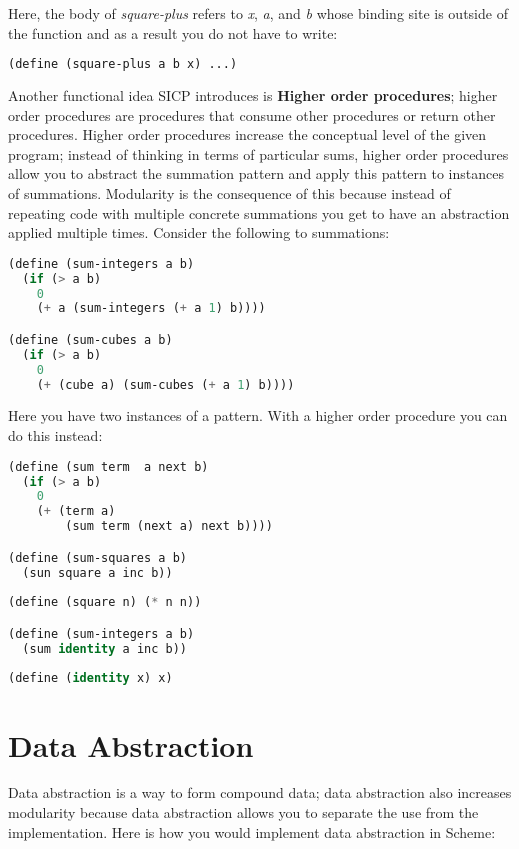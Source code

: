 \documentclass{amsbook}
\begin{document}
Here, the body of \textit{square-plus} refers to \textit{x}, \textit{a}, and \textit{b} whose binding site is outside of the function and as a result you do not have to write:

\begin{lstlisting}[language=Lisp]
(define (square-plus a b x) ...)
\end{lstlisting}
     
Another functional idea SICP introduces is \textbf{Higher order procedures}; higher order procedures are procedures that consume other procedures or return other procedures. Higher order procedures increase the conceptual level of the given program; instead of thinking in terms of particular sums, higher order procedures allow you to abstract the summation pattern and apply this pattern to instances of summations. Modularity is the consequence of this because instead of repeating code with multiple concrete summations you get to have an abstraction applied multiple times. Consider the following to summations:

\begin{lstlisting}[language=Lisp]
(define (sum-integers a b)
  (if (> a b)
  	0
  	(+ a (sum-integers (+ a 1) b))))

(define (sum-cubes a b)
  (if (> a b)
  	0
  	(+ (cube a) (sum-cubes (+ a 1) b))))
\end{lstlisting}

Here you have two instances of a pattern. With a higher order procedure you can do this instead:

\begin{lstlisting}[language=Lisp]
(define (sum term  a next b)
  (if (> a b)
  	0
  	(+ (term a)
     	(sum term (next a) next b))))

(define (sum-squares a b)
  (sun square a inc b))
  
(define (square n) (* n n))

(define (sum-integers a b)
  (sum identity a inc b))
  
(define (identity x) x)
\end{lstlisting}

\section{Data Abstraction}

Data abstraction is a way to form compound data; data abstraction also increases modularity because data abstraction allows you to separate the use from the implementation. Here is how you would implement data abstraction in Scheme:
\end{document}
